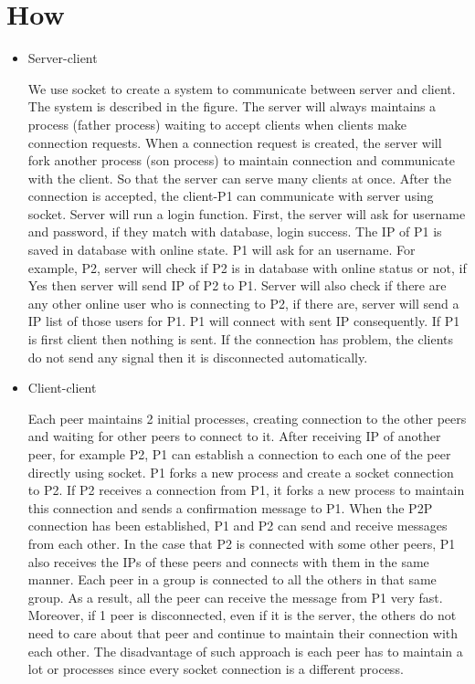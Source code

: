 \documentclass[12pt]{article}
\begin{document}
    \section{How}
    \begin{itemize}
    \item Server-client
    
    We use socket to create a system to communicate between server and client. The system is described in the figure.
The server will always maintains a process (father process) waiting to accept clients when clients make connection requests.
When a connection request is created, the server will fork another process (son process) to maintain connection and communicate with the client. So that the server can serve many clients at once.
After the connection is accepted, the client-P1 can communicate with server using socket. Server will run a login function.
First, the server will ask for username and password, if they match with database, login success. The IP of P1 is saved in database with online state.
P1 will ask for an username. For example, P2, server will check if P2 is in database with online status or not, if Yes then server will send IP of P2 to P1.
Server will also check if there are any other online user who is connecting to P2, if there are, server will send a IP list of those users for P1. P1 will connect with sent IP consequently. If P1 is first client then nothing is sent.
If the connection has problem, the clients do not send any signal then it is disconnected automatically.
    \item Client-client
    
    Each peer maintains 2 initial processes, creating connection to the other peers and waiting for other peers to connect to it. After receiving IP of another peer, for example P2, P1 can establish a connection to each one of the peer directly using socket. P1 forks a new process and create a socket connection to P2. If P2 receives a connection from P1, it forks a new process to maintain this connection and sends a confirmation message to P1. When the P2P connection has been established, P1 and P2 can send and receive messages from each other. In the case that P2 is connected with some other peers, P1 also receives the IPs of these peers and connects with them in the same manner. Each peer in a group is connected to all the others in that same group. As a result, all the peer can receive the message from P1 very fast. Moreover, if 1 peer is disconnected, even if it is the server, the others do not need to care about that peer and continue to maintain their connection with each other. The disadvantage of such approach is each peer has to maintain a lot or processes since every socket connection is a different process.
    \end{itemize}
    
\end{document}
